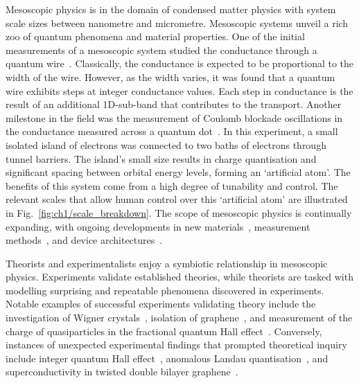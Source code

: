 \noindent Mesoscopic physics is in the domain of condensed matter physics with system scale sizes between nanometre and micrometre. Mesoscopic systems unveil a rich zoo of quantum phenomena and material properties. One of the initial measurements of a mesoscopic system studied the conductance through a quantum wire~\cite{qpc_first_measurement, qpc_second_measurement}. 
Classically, the conductance is expected to be proportional to the width of the wire. 
However, as the width varies, it was found that a quantum wire exhibits steps at integer conductance values. Each step in conductance 
is the result of an additional 1D-sub-band that contributes to the transport. Another milestone in the field was the measurement of Coulomb blockade oscillations in the conductance measured across a quantum dot~\cite{first_charging_of_qd}. 
In this experiment, a small isolated island of electrons was connected to two baths of electrons through tunnel barriers. 
The island's small size results in charge quantisation and significant spacing between orbital energy levels, forming an `artificial atom'. 
The benefits of this system come from a high degree of tunability and control. The relevant scales that allow human control over this `artificial atom' are illustrated in Fig.~\ref{fig:ch1/scale_breakdown}.
The scope of mesoscopic physics is continually expanding, with ongoing developments in new materials~\cite{manfra_inas}, measurement methods~\cite{child_meas}, and device architectures~\cite{borsoi2022shared, raysu}.

Theorists and experimentalists enjoy a symbiotic relationship in mesoscopic physics. Experiments validate established theories, while theorists are tasked with modelling surprising and repeatable phenomena discovered in experiments. Notable examples of successful experiments validating theory include the investigation of Wigner crystals~\cite{wigner_solid}, isolation of graphene~\cite{graphene}, and measurement of the charge of quasiparticles in the fractional quantum Hall effect~\cite{fractional_charge}. Conversely, instances of unexpected experimental findings that prompted theoretical inquiry include integer quantum Hall effect~\cite{klitzing}, anomalous Landau quantisation~\cite{landau_quantisation}, and superconductivity in twisted double bilayer graphene~\cite{raysu}.

